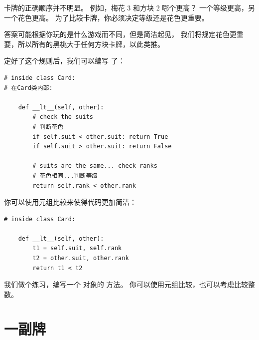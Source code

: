 卡牌的正确顺序并不明显。
例如，梅花 3 和方块 2 哪个更高？
一个等级更高，另一个花色更高。
为了比较卡牌，你必须决定等级还是花色更重要。


答案可能根据你玩的是什么游戏而不同，但是简洁起见，
我们将规定花色更重要，所以所有的黑桃大于任何方块卡牌，以此类推。



定好了这个规则后，我们可以编写  了：

\begin{lstlisting}
# inside class Card:
# 在Card类内部:

    def __lt__(self, other):
        # check the suits
        # 判断花色
        if self.suit < other.suit: return True
        if self.suit > other.suit: return False

        # suits are the same... check ranks
        # 花色相同...判断等级
        return self.rank < other.rank
\end{lstlisting}


你可以使用元组比较来使得代码更加简洁：


\begin{lstlisting}
# inside class Card:

    def __lt__(self, other):
        t1 = self.suit, self.rank
        t2 = other.suit, other.rank
        return t1 < t2
\end{lstlisting}

%

我们做个练习，编写一个  对象的 方法。
你可以使用元组比较，也可以考虑比较整数。


\section{一副牌}

